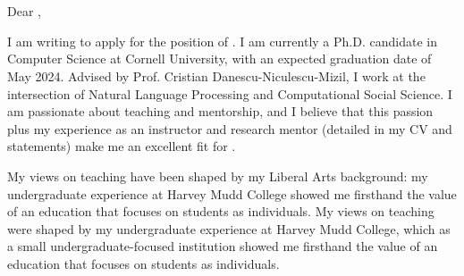 \documentclass[12pt]{letter}
\begin{document}
\signature{Jonathan P. Chang}
\begin{letter}{
\department \\
\schoolnamelong \\
\schooladdress
}

\opening{
    Dear ,
}

I am writing to apply for the position of \position.
I am currently a Ph.D. candidate in Computer Science at Cornell University, with an expected graduation date of May 2024.
Advised by Prof. Cristian Danescu-Niculescu-Mizil, I work at the intersection of Natural Language Processing and Computational Social Science.
I am passionate about teaching and mentorship, and I believe that this passion plus my experience as an instructor and research mentor (detailed in my CV and statements) make me an excellent fit for \schoolname.

\ifliberalarts
My views on teaching have been shaped by my Liberal Arts background: my undergraduate experience at Harvey Mudd College showed me firsthand the value of an education that focuses on students as individuals.
\else
My views on teaching were shaped by my undergraduate experience at Harvey Mudd College, which as a small undergraduate-focused institution showed me firsthand the value of an education that focuses on students as individuals.
\fi
\coverteachingpara


\end{letter}
\end{document}
